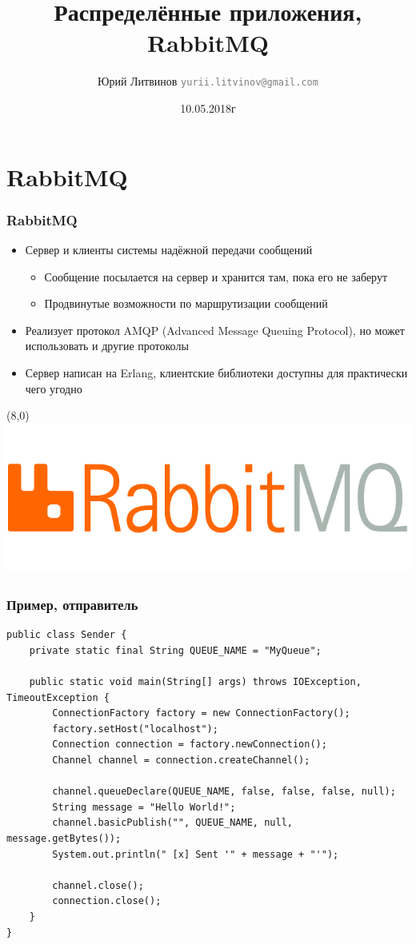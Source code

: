 \documentclass[xetex,mathserif,serif]{beamer}
\title{Распределённые приложения, RabbitMQ}
\author[Юрий Литвинов]{Юрий Литвинов \newline \textcolor{gray}{\small\texttt{yurii.litvinov@gmail.com}}}
\date{10.05.2018г}
\begin{document}
	\frame{\titlepage}

	\section{RabbitMQ}

	\begin{frame}
		\frametitle{RabbitMQ}
		\begin{itemize}
			\item Сервер и клиенты системы надёжной передачи сообщений
			\begin{itemize}
				\item Сообщение посылается на сервер и хранится там, пока его не заберут
				\item Продвинутые возможности по маршрутизации сообщений
			\end{itemize}
			\item Реализует протокол AMQP (Advanced Message Queuing Protocol), но может использовать и другие протоколы
			\item Сервер написан на Erlang, клиентские библиотеки доступны для практически чего угодно
		\end{itemize}
		\begin{textblock}{3}(8,0)
			\includegraphics[width=\textwidth]{rabbitmqLogo.png}
		\end{textblock}
	\end{frame}

	\begin{frame}[fragile]
		\frametitle{Пример, отправитель}
		\begin{ssmall}
			\begin{verbatim}
public class Sender {
    private static final String QUEUE_NAME = "MyQueue";

    public static void main(String[] args) throws IOException, TimeoutException {
        ConnectionFactory factory = new ConnectionFactory();
        factory.setHost("localhost");
        Connection connection = factory.newConnection();
        Channel channel = connection.createChannel();

        channel.queueDeclare(QUEUE_NAME, false, false, false, null);
        String message = "Hello World!";
        channel.basicPublish("", QUEUE_NAME, null, message.getBytes());
        System.out.println(" [x] Sent '" + message + "'");

        channel.close();
        connection.close();
    }
}
			\end{verbatim}
		\end{ssmall}
	\end{frame}
\end{document}
